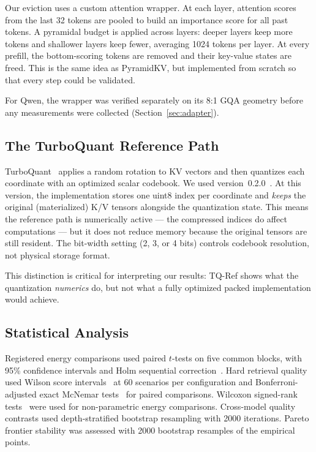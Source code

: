 \documentclass[sigconf,nonacm]{acmart}
\begin{document}
Our eviction uses a custom attention wrapper. At each layer, attention scores from
the last 32 tokens are pooled to build an importance score for all past tokens.
A pyramidal budget is applied across layers: deeper layers keep more tokens and
shallower layers keep fewer, averaging 1024 tokens per layer. At every prefill,
the bottom-scoring tokens are removed and their key-value states are freed. This
is the same idea as PyramidKV, but implemented from scratch so that every step
could be validated.

For Qwen, the wrapper was verified separately on its 8:1 GQA geometry before any
measurements were collected (Section~\ref{sec:adapter}).

\subsection{The TurboQuant Reference Path}

TurboQuant~\cite{zandieh_turboquant_2025,zandieh2026turboquant} applies a random rotation to KV vectors
and then quantizes each coordinate with an optimized scalar codebook. We used
version~0.2.0~\cite{zandieh2026turboquant}. At this version, the implementation stores one uint8 index per
coordinate and \emph{keeps} the original (materialized) K/V tensors alongside
the quantization state. This means the reference path is numerically active ---
the compressed indices do affect computations --- but it does not reduce memory
because the original tensors are still resident. The bit-width setting (2, 3, or
4 bits) controls codebook resolution, not physical storage format.

This distinction is critical for interpreting our results: TQ-Ref shows what the
quantization \emph{numerics} do, but not what a fully optimized packed
implementation would achieve.

\subsection{Statistical Analysis}

Registered energy comparisons used paired $t$-tests on five common blocks, with
95\% confidence intervals and Holm sequential correction~\cite{holm1979simple}. Hard retrieval quality
used Wilson score intervals~\cite{wilson1927probable} at 60 scenarios per configuration and Bonferroni-adjusted
exact McNemar tests~\cite{mcnemar1947note} for paired comparisons. Wilcoxon signed-rank tests~\cite{wilcoxon1945individual}
were used for non-parametric energy comparisons. Cross-model quality contrasts used
depth-stratified bootstrap resampling with 2000 iterations. Pareto frontier
stability was assessed with 2000 bootstrap resamples of the empirical points.
\end{document}
